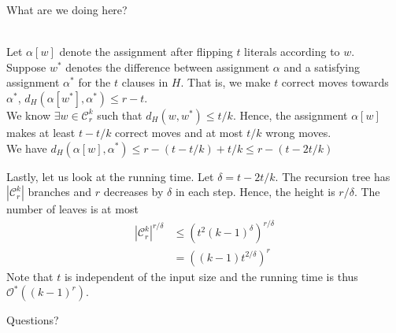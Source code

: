 \documentclass[pdf] {beamer}
\newcommand{\dist}[2]{d_H(#1,#2)}
\newcommand{\astar}{\alpha^*}
\newcommand{\cc}{\mathcal{C}}
\renewcommand{\O}{\mathcal{O}^*}
\begin{document}
	\begin{frame}
		What are we doing here?\\~\
		
		Let $\alpha[w]$ denote the assignment after flipping $t$ literals according to $w$. \\
		Suppose $w^*$ denotes the difference between assignment $\alpha$ and a satisfying assignment $\astar$ for the $t$ clauses in $H$. That is, we make $t$ correct moves towards $\astar$, $\dist{\alpha[w^*]}{\astar} \leq r - t$. \\
		We know $\exists w \in \cc_r^k$ such that $\dist{w}{w^*} \leq t/k$. Hence, the assignment $\alpha[w]$ makes at least $t - t/k$ correct moves and at most $t/k$ wrong moves.\\
		 We have $\dist{\alpha[w]}{\astar} \leq r - (t - t/k) + t/k \leq r - (t-2t/k)$
	\end{frame}
	\begin{frame}
		Lastly, let us look at the running time. Let $\delta = t - 2t/k$. The recursion tree has $|\cc_r^k|$ branches and $r$ decreases by $\delta$ in each step. Hence, the height is ${r/\delta}$. The number of leaves is at most
		\begin{align*}
		|\mathcal{C}_r^k|^{r/\delta} &\leq (t^{2}(k-1)^{\delta})^{r/\delta}\\
		&= ((k-1)t^{2/\delta})^{r}
		\end{align*}
		Note that $t$ is independent of the input size and the running time is thus $\O((k-1)^r)$.
	\end{frame}
	\begin{frame}
	Questions?
\end{frame}
\end{document}
